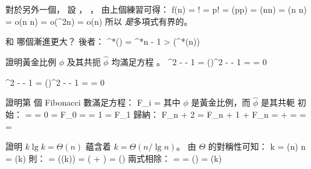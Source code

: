 對於另外一個，
設 ， ，
由上個練習可得：
\startformula\startalign
 \NC \lg f(n) \NC = \lg \lceil{}\rceil ! \NR
 \NC          \NC = \lg p! \NR
 \NC          \NC = \Theta(p\lg p) \NR
 \NC          \NC = \Theta(\lceil\lg\lg n\rceil \lg \lceil \lg\lg n\rceil) \NR
 \NC          \NC = \Theta(\lg\lg n \cdot \lg\lg\lg n) \NR
 \NC          \NC = o(\lg\lg n \cdot \lg\lg n) \NR
 \NC          \NC = o(\lg^2\lg n) \NR
 \NC          \NC = o(\lg n) \NR
\stopalign\stopformula
所以  \emph{是}多項式有界的。
\stopANSWER

\startEXERCISE\DIFFICULT
{} 和  哪個漸進更大？
\stopEXERCISE
\startANSWER
後者：
\startformula
\lg^*() = \lg^*n - 1 > \lg(\lg^*(n))
\stopformula
\stopANSWER

\startEXERCISE
證明黃金比例 $\phi$ 及其共扼 $\hat \phi$ 均滿足方程 。
\stopEXERCISE
\startANSWER
\startformula\startalign
 \NC \phi^2 - \phi - 1
     \NC = ()^2 -  - 1 \NR
 \NC \NC =  \NR
 \NC \NC = 0 \NR
\stopalign\stopformula

\startformula\startalign
 \NC \hat\phi^2 - \hat\phi - 1
     \NC = ()^2 -  - 1 \NR
 \NC \NC =  \NR
 \NC \NC = 0 \NR
\stopalign\stopformula
\stopANSWER

\startEXERCISE
證明第  個 Fibonacci 數滿足方程：
\startformula
F_i = 
\stopformula
其中 $\phi$ 是黃金比例，而 $\hat \phi$ 是其共軛
\stopEXERCISE
\startANSWER
初始：
\startformula\startalign
\NC {}
    \NC =  = 0 = F_0 \NR
\NC {}
    \NC =  = 1 = F_1 \NR
\stopalign\stopformula
歸納：
\startformula\startalign
 \NC F_{n + 2} \NC = F_{n + 1} + F_n \NR
 \NC \NC =  +  \NR
 \NC \NC =  \NR
 \NC \NC =  \NR
 \NC \NC =  \NR
\stopalign\stopformula
\stopANSWER

\startEXERCISE
證明 $k\lg k = \Theta(n)$ 蘊含着 $k = \Theta(n/\lg n)$。
\stopEXERCISE
\startANSWER
由 $\Theta$ 的對稱性可知：
\startformula
k = \Theta(n) \Rightarrow n = \Theta(k)
\stopformula
則：
\startformula\startmathalignment
\NC {}
    \NC = \Theta(\lg(k)) \NR
\NC \NC = \Theta( + \lg{}) \NR
\NC \NC = \Theta() \NR
\stopmathalignment\stopformula
兩式相除：
\startformula
{}
  = 
  = \Theta()
  = \Theta(k)
\stopformula
\stopANSWER

\stopsection
